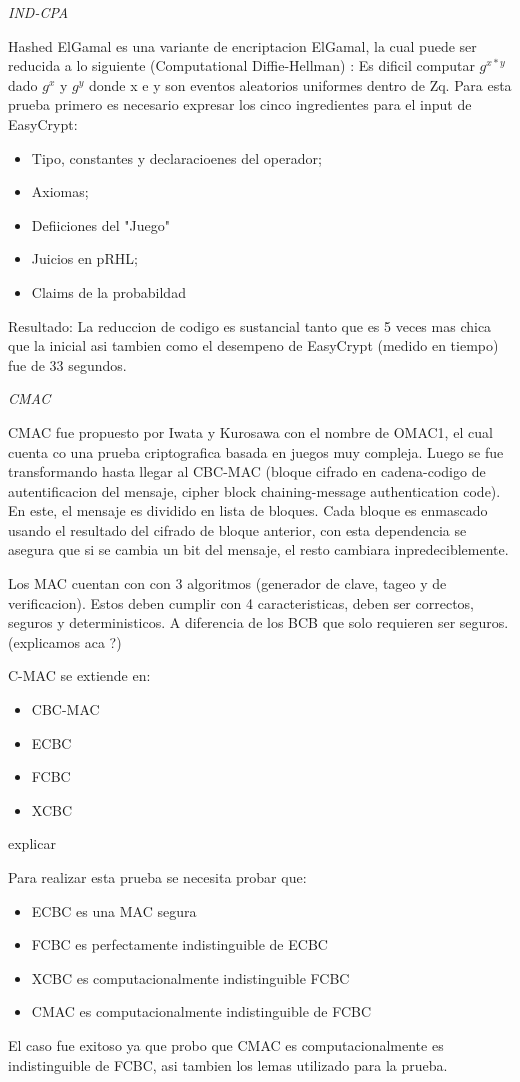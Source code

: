 \documentclass[runningheads,a4paper]{llncs}
\begin{document}
\centerline{\emph{IND-CPA}}

Hashed ElGamal es una variante de encriptacion ElGamal, la cual puede ser reducida a lo siguiente (Computational Diffie-Hellman) : Es dificil computar $g^{x*y}$ dado $g^x$ y $g^y$ donde x e y son eventos aleatorios uniformes dentro de Zq.
Para esta prueba primero es necesario expresar los cinco ingredientes para el input de EasyCrypt:
\begin{itemize}
	\item Tipo, constantes y declaracioenes del operador;
	\item Axiomas;
	\item Defiiciones del "Juego"
	\item Juicios en pRHL;
	\item Claims de la probabildad
\end{itemize}

Resultado: La reduccion de codigo es sustancial tanto que es 5 veces mas chica que la inicial asi tambien como el desempeno de EasyCrypt (medido en tiempo) fue de 33 segundos.\cite{article5}


\centerline{\emph{CMAC}}
\cite{article7}
CMAC fue propuesto por Iwata y Kurosawa con el nombre de OMAC1, el cual cuenta co una prueba criptografica basada en juegos muy compleja. Luego se fue transformando hasta llegar al CBC-MAC (bloque cifrado en cadena-codigo de autentificacion del mensaje, cipher block chaining-message authentication code). En este, el mensaje es dividido en lista de bloques. Cada bloque es enmascado usando el resultado del cifrado de bloque anterior, con esta dependencia se asegura que si se cambia un bit  del mensaje, el resto cambiara inpredeciblemente.

Los MAC cuentan con con 3 algoritmos (generador de clave, tageo y de verificacion). Estos deben cumplir con 4 caracteristicas, deben ser correctos, seguros y deterministicos. A diferencia de los BCB que solo requieren ser seguros. (explicamos aca ?)

C-MAC se extiende en:
\begin{itemize}
	\item CBC-MAC
	\item ECBC
	\item FCBC
	\item XCBC
\end{itemize}
 explicar

Para realizar esta prueba se necesita probar que:
\begin{itemize}
	\item ECBC es una MAC segura
	\item FCBC es perfectamente indistinguible de ECBC
	\item XCBC es computacionalmente indistinguible FCBC
	\item CMAC es computacionalmente indistinguible de FCBC	
\end{itemize}
El caso fue exitoso ya que probo que CMAC es computacionalmente es indistinguible de FCBC, asi tambien los lemas utilizado para la prueba.
\end{document}
